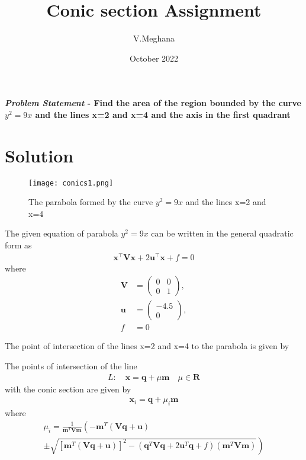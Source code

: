 \documentclass[journal,10pt,twocolumn]{article}
\title{\textbf{Conic section Assignment}}
\author{V.Meghana}
\date{October 2022}
\let\vec\mathbf
\newcommand{\myvec}[1]{\ensuremath{\begin{pmatrix}#1\end{pmatrix}}}
\providecommand{\brak}[1]{\ensuremath{\left(#1\right)}}
\providecommand{\lbrak}[1]{\ensuremath{\left(#1\right.}}
\providecommand{\rbrak}[1]{\ensuremath{\left.#1\right)}}
\providecommand{\sbrak}[1]{\ensuremath{{}\left[#1\right]}}
\begin{document}
\maketitle
\paragraph{\textit{Problem Statement} - Find the area of the region bounded by the curve $y^2=9x$ and the lines x=2 and x=4 and the axis in the first quadrant}

\section*{\large Solution}

\begin{figure}[h]
\centering
\texttt{[image: conics1.png]}

\caption{The parabola formed by the curve $y^2 = 9x$ and the lines x=2 and x=4}
\label{fig:parabola}
\end{figure}

The given equation of parabola $y^2 = 9x$ can be written in the general quadratic form as
\begin{align}
    \label{eq:conic_quad_form}
    \vec{x}^{\top}\vec{V}\vec{x}+2\vec{u}^{\top}\vec{x}+f=0
    \end{align}
where
\begin{align}
 \label{eq:V_matrix}
 \vec{V} &= \myvec{0 & 0\\0 & 1},
 \\
 \label{eq:u_vector}
 \vec{u} &= \myvec{-4.5\\0},
 \\
 \label{eq:f_value}
 f &= 0
\end{align}



The point of intersection of the lines x=2 and x=4 to the parabola is given by



The points of intersection of the line 
\begin{align}
 L: \quad \vec{x} = \vec{q} + \mu \vec{m} \quad \mu \in \mathbf{R}
\label{eq:conic_tangent}
\end{align}
with the conic section are given by
\begin{align}
\vec{x}_i = \vec{q} + \mu_i \vec{m}
\label{eq:conic_tangent_pts}
\end{align}
%
where
{\tiny
\begin{multline}
\mu_i = \frac{1}
{
\vec{m}^T\vec{V}\vec{m}
}
\lbrak{-\vec{m}^T\brak{\vec{V}\vec{q}+\vec{u}}}
\\
\pm
\rbrak{\sqrt{
\sbrak{
\vec{m}^T\brak{\vec{V}\vec{q}+\vec{u}}
}^2
-
\brak
{
\vec{q}^T\vec{V}\vec{q} + 2\vec{u}^T\vec{q} +f
}
\brak{\vec{m}^T\vec{V}\vec{m}}
}
}
\label{eq:tangent_roots}
\end{multline}
}
\end{document}
